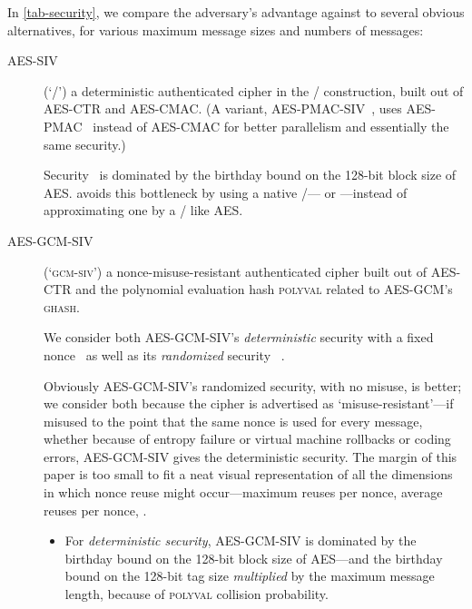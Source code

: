 \documentclass[draft]{article}
\DeclareRobustCommand{\operatorsc}[1]{{%
  \ifmmode\let\next=\operatorname\else\let\next=\relax\fi\next{\textsc{#1}}}}
\def\Salsa#1/{\operatorsc{Salsa#1}}
\def\ChaCha#1/{\operatorsc{ChaCha#1}}
\def\Daence/{\operatorsc{Daence}}
\def\GHASH/{\textsc{ghash}}
\def\POLYVAL/{\textsc{polyval}}
\def\GCMSIV/{\textsc{gcm\nobreakdash-siv}}
\def\AES/{AES}
\def\AESCTR/{AES\nobreakdash-CTR}
\def\AESSIV/{AES\nobreakdash-CTR}
\def\AESCMAC/{AES\nobreakdash-CMAC}
\def\AESPMAC/{AES\nobreakdash-PMAC}
\def\AESSIV/{AES\nobreakdash-SIV}
\def\AESGCM/{AES\nobreakdash-GCM}
\def\AESGCMSIV/{AES\nobreakdash-GCM\nobreakdash-SIV}
\def\AESPMACSIV/{AES\nobreakdash-PMAC\nobreakdash-SIV}
\begin{document}
In \autoref{tab-security}, we compare the adversary's advantage against
 \Daence/ to several obvious alternatives, for various maximum message
 sizes and numbers of messages:

\begin{description}
  \item[\AESSIV/] (`\SIV/')
     a deterministic authenticated cipher in the \SIV/ construction,
     built out of \AESCTR/ and \AESCMAC/.
    (A variant, \AESPMACSIV/~\cite{arcieri2018aespmacsiv}, uses
     \AESPMAC/~\cite{black-rogaway2002pmac-eurocrypt} instead of
     \AESCMAC/ for better parallelism and essentially the same
     security.)

    Security~%
     \cite[\S4, Theorem~2]{rogaway-shrimpton2006keywrap}%
     \cite[\S5, Theorem~3, with $p=1$]{rogaway-shrimpton2006keywrap}%
     \cite[\S2, Theorem~2.2]{bernstein2005permutations}
     is dominated by the birthday bound on the 128-bit block size of
     \AES/.
    \Daence/ avoids this bottleneck by using a native \PRF/---\Salsa20/
     or \ChaCha/---instead of approximating one by a \PRP/ like \AES/.

  \item[\AESGCMSIV/] (`\GCMSIV/')
     a nonce-misuse-resistant authenticated cipher built out of
     \AESCTR/ and the polynomial evaluation hash \POLYVAL/ related to
     \AESGCM/'s \GHASH/.

    We consider both \AESGCMSIV/'s \emph{deterministic} security with a
     fixed nonce~%
     \cite[\S4, Theorem~3, with 256-bit \AES/ keys and $Q=1$ distinct
       nonces]{iwata-seurin2017gcmsivsecurity}
     as well as its \emph{randomized} security~%
     \cite[\S3.3, Corollary~1, with 256-bit \AES/ keys and random
       nonces]{iwata-seurin2017gcmsivsecurity}.

    Obviously \AESGCMSIV/'s randomized security, with no misuse, is
     better; we consider both because the cipher is advertised as
     `misuse-resistant'---if misused to the point that the same nonce
     is used for every message, whether because of entropy failure or
     virtual machine rollbacks or coding errors, \AESGCMSIV/ gives the
     deterministic security.
    The margin of this paper is too small to fit a neat visual
     representation of all the dimensions in which nonce reuse might
     occur---maximum reuses per nonce, average reuses per nonce, \etc.
    \begin{itemize}
      \item For \emph{deterministic security}, \AESGCMSIV/ is dominated
         by the birthday bound on the 128-bit block size of \AES/---and
         the birthday bound on the 128-bit tag size \emph{multiplied}
         by the maximum message length, because of \POLYVAL/ collision
         probability.


\end{itemize}
\end{description}
\end{document}
